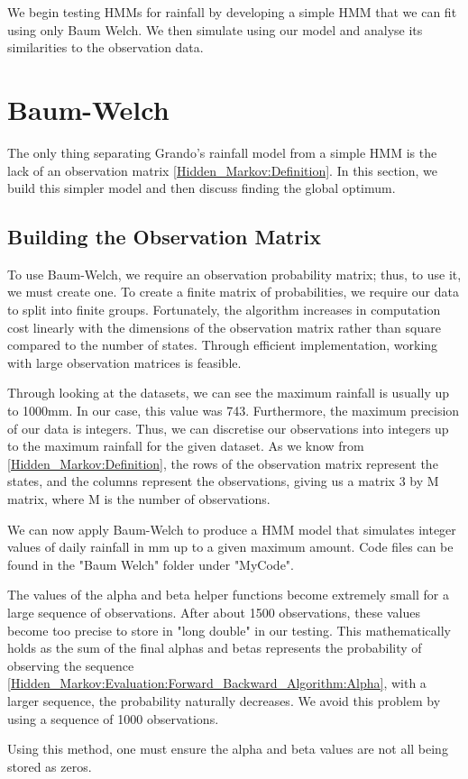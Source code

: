 We begin testing HMMs for rainfall by developing a simple HMM that we can fit using only Baum Welch. We then simulate using our model and analyse its similarities to the observation data.

\section{Baum-Welch}
\label{Simple_Rainfall_HMM:Baum_Welch}
The only thing separating Grando's rainfall model from a simple HMM is the lack of an observation matrix \ref{Hidden_Markov:Definition}. In this section, we build this simpler model and then discuss finding the global optimum.

    \subsection{Building the Observation Matrix}
    \label{Simple_Rainfall_HMM:Baum_Welch:Building_the_Observation_Matrix}

    To use Baum-Welch, we require an observation probability matrix; thus, to use it, we must create one. To create a finite matrix of probabilities, we require our data to split into finite groups. Fortunately, the algorithm increases in computation cost linearly with the dimensions of the observation matrix rather than square compared to the number of states. Through efficient implementation, working with large observation matrices is feasible.

    Through looking at the datasets, we can see the maximum rainfall is usually up to 1000mm. In our case, this value was 743. Furthermore, the maximum precision of our data is integers. Thus, we can discretise our observations into integers up to the maximum rainfall for the given dataset. As we know from \ref{Hidden_Markov:Definition}, the rows of the observation matrix represent the states, and the columns represent the observations, giving us a matrix 3 by M matrix, where M is the number of observations.

    We can now apply Baum-Welch to produce a HMM model that simulates integer values of daily rainfall in mm up to a given maximum amount. Code files can be found in the "Baum Welch" folder under "MyCode". 

    \begin{note}
        The values of the alpha and beta helper functions become extremely small for a large sequence of observations. After about 1500 observations, these values become too precise to store in "long double" in our testing. This mathematically holds as the sum of the final alphas and betas represents the probability of observing the sequence \ref{Hidden_Markov:Evaluation:Forward_Backward_Algorithm:Alpha}, with a larger sequence, the probability naturally decreases. We avoid this problem by using a sequence of 1000 observations. 
        
        Using this method, one must ensure the alpha and beta values are not all being stored as zeros.
    \end{note}


